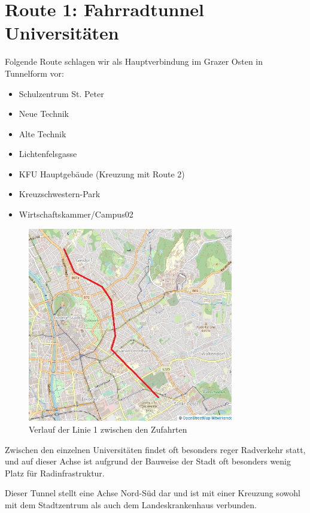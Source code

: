 \section{Route 1: Fahrradtunnel Universitäten}
Folgende Route schlagen wir als Hauptverbindung im Grazer Osten in Tunnelform vor:

\begin{itemize}
    \item Schulzentrum St. Peter
    \item Neue Technik
    \item Alte Technik
    \item Lichtenfelsgasse
    \item KFU Hauptgebäude (Kreuzung mit Route 2)
    \item Kreuzschwestern-Park
    \item Wirtschaftskammer/Campus02
\end{itemize}

\begin{figure}
    \includegraphics[width=0.8\textwidth]{main/bike/tunnel/uni/linie1}
    \centering
    \caption[Verlauf Linie 1]{Verlauf der Linie 1 zwischen den Zufahrten}
\end{figure}

Zwischen den einzelnen Universitäten findet oft besonders reger Radverkehr statt, und auf dieser Achse ist aufgrund der Bauweise der Stadt oft besonders wenig Platz für Radinfrastruktur.

Dieser Tunnel stellt eine Achse Nord-Süd dar und ist mit einer Kreuzung sowohl mit dem Stadtzentrum als auch dem Landeskrankenhaus verbunden.


